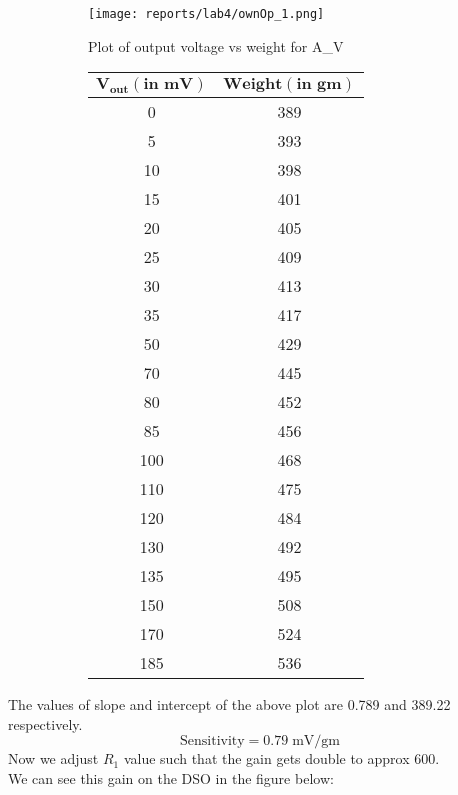 \documentclass[12pt]{article}
\begin{document}
        \begin{figure}[H]
            \begin{subfigure}{0.7\linewidth}
                \centering
                \texttt{[image: reports/lab4/ownOp\_1.png]}
                \caption{Plot of output voltage vs weight for A_V }
            \end{subfigure} 
            \begin{subfigure}{0.2\linewidth}
                \centering
                \begin{tabular}{|c|c|}
                \hline
                \bfseries $\mathbf{V_{out}(\text{in mV})}$	& \bfseries	$\mathbf{Weight(\text{in gm})}$	\\
                \hline
                    0  &		389 \\
                    5  &		393 \\
                    10 &    	398 \\
                    15 &		401 \\
                    20 &		405 \\
                    25 &		409 \\
                    30 &		413 \\
                    35 &		417 \\
                    50 &		429 \\
                    70 &		445 \\
                    80 &		452 \\
                    85 &		456 \\
                    100&		468 \\
                    110&		475 \\ 
                    120&		484 \\
                    130&		492 \\
                    135&		495 \\
                    150&		508 \\
                    170&		524 \\
                    185&		536 \\

                \hline
                \end{tabular}
            \end{subfigure} 
        \end{figure}
        \noindent
        The values of slope and intercept of the above plot are 0.789 and 389.22 respectively.
        \begin{equation}
            \boxed{\text{Sensitivity} = 0.79\; \text{mV/gm}} 
        \end{equation}
        \noindent
        Now we adjust $R_1$ value such that the gain gets double to approx 600.\\
        \noindent
        We can see this gain on the DSO in the figure below:
        
\end{document}
